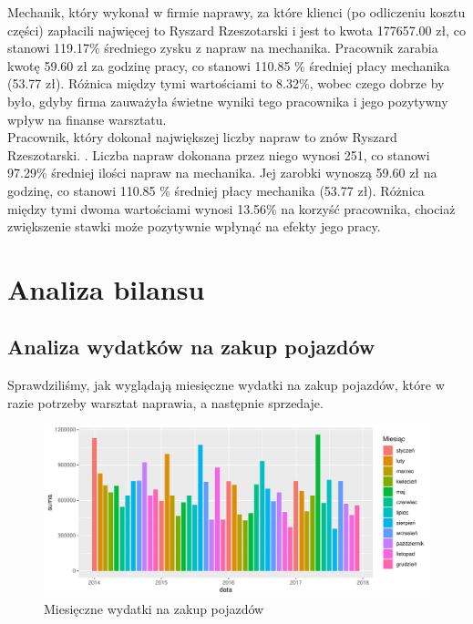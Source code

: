 \documentclass{article}\usepackage[]{graphicx}\usepackage[]{xcolor}
\makeatletter
\def\maxwidth{ %
  \ifdim\Gin@nat@width>\linewidth
    \linewidth
  \else
    \Gin@nat@width
  \fi
}
\newenvironment{knitrout}{}{} %
\makeatother
\begin{document}
Mechanik, który wykonał w firmie naprawy, za które klienci (po odliczeniu kosztu części) zapłacili najwięcej to Ryszard Rzeszotarski i jest to kwota 177657.00 zł, co stanowi 119.17\% średniego zysku z napraw na mechanika. Pracownik zarabia kwotę 59.60 zł za godzinę pracy, co stanowi 110.85 \% średniej płacy mechanika (53.77 zł). Różnica między tymi wartościami to 8.32\%, wobec czego dobrze by było, gdyby firma zauważyła świetne wyniki tego pracownika i jego pozytywny wpływ na finanse warsztatu. \\

Pracownik, który dokonał największej liczby napraw to znów Ryszard Rzeszotarski. . Liczba napraw dokonana przez niego wynosi 251, co stanowi 97.29\% średniej ilości napraw na mechanika. Jej zarobki wynoszą 59.60 zł na godzinę, co stanowi 110.85 \% średniej płacy mechanika (53.77 zł). Różnica między tymi dwoma wartościami wynosi 13.56\% na korzyść pracownika, chociaż zwiększenie stawki może pozytywnie wpłynąć na efekty jego pracy.

\section{Analiza bilansu}

\subsection{Analiza wydatków na zakup pojazdów}

Sprawdziliśmy, jak wyglądają miesięczne wydatki na zakup pojazdów, które w razie potrzeby warsztat naprawia, a następnie sprzedaje.

\begin{knitrout}
\color{fgcolor}\begin{figure}[H]

{\centering \includegraphics[width=\maxwidth]{figure/fig_zakup_pojazdu-1} 

}

\caption[Miesięczne wydatki na zakup pojazdów]{Miesięczne wydatki na zakup pojazdów}\label{fig:fig_zakup_pojazdu}
\end{figure}

\end{knitrout}
\end{document}
